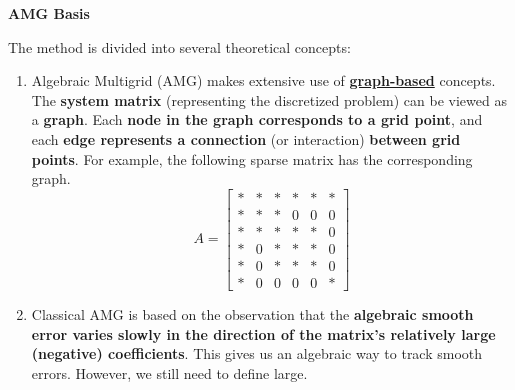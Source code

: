 \highspace
\begin{flushleft}
    \textcolor{Green3}{ \textbf{AMG Basis}}
\end{flushleft}
The method is divided into several theoretical concepts:
\begin{enumerate}
    \item Algebraic Multigrid (AMG) makes extensive use of \textbf{\underline{graph-based}} concepts. The \textbf{system matrix} (representing the discretized problem) can be viewed as a \textbf{graph}. Each \textbf{node in the graph corresponds to a grid point}, and each \textbf{edge represents a connection} (or interaction) \textbf{between grid points}. For example, the following sparse matrix has the corresponding graph.
    \begin{equation*}
        A = \begin{bmatrix}
            * & * & * & * & * & * \\
            * & * & * & 0 & 0 & 0 \\
            * & * & * & * & * & 0 \\
            * & 0 & * & * & * & 0 \\
            * & 0 & * & * & * & 0 \\
            * & 0 & 0 & 0 & 0 & *
        \end{bmatrix}
    \end{equation*}
    
    \begin{center}
    \end{center}


    \item Classical AMG is based on the observation that the \textbf{algebraic smooth error varies slowly in the direction of the matrix's relatively large (negative) coefficients}. This gives us an algebraic way to track smooth errors. However, we still need to define large.


\end{enumerate}
